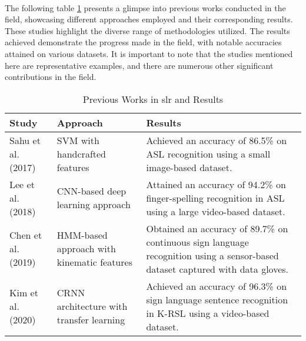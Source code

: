 \paragraph{}
The following table \ref{tab:previous-works} presents a glimpse into previous works conducted in the field, showcasing different approaches employed and their corresponding results. These studies highlight the diverse range of methodologies utilized. The results achieved demonstrate the progress made in the field, with notable accuracies attained on various datasets. It is important to note that the studies mentioned here are representative examples, and there are numerous other significant contributions in the field.
\begin{table}[h]
	\centering
	\label{tab:previous-works}
	\caption{Previous Works in \ac{slr} and Results}
	\begin{tabular}{|p{}|p{}|p{}|}
		\hline
		\textbf{Study} & \textbf{Approach} & \textbf{Results} \\
		\hline
		Sahu et al. (2017) \cite{sahu2017} & SVM with handcrafted features & Achieved an accuracy of 86.5\% on ASL recognition using a small image-based dataset. \\
		\hline
		Lee et al. (2018) \cite{lee2018} & CNN-based deep learning approach & Attained an accuracy of 94.2\% on finger-spelling recognition in ASL using a large video-based dataset. \\
		\hline
		Chen et al. (2019) \cite{chen2019} & HMM-based approach with kinematic features & Obtained an accuracy of 89.7\% on continuous sign language recognition using a sensor-based dataset captured with data gloves. \\
		\hline
		Kim et al. (2020) \cite{kim2020} & CRNN architecture with transfer learning & Achieved an accuracy of 96.3\% on sign language sentence recognition in K-RSL using a video-based dataset. \\
		\hline
	\end{tabular}
\end{table}

